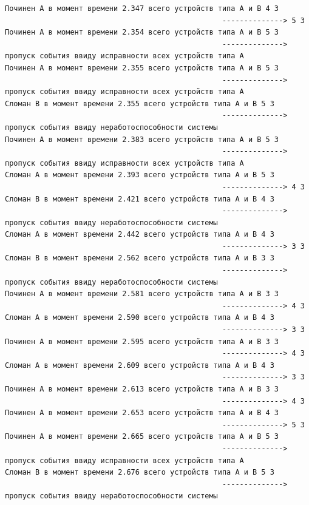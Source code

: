 \begin{verbatim}
Починен A в момент времени 2.347 всего устройств типа А и В 4 3
                                                  --------------> 5 3
Починен A в момент времени 2.354 всего устройств типа А и В 5 3
                                                  --------------> пропуск события ввиду исправности всех устройств типа А
Починен A в момент времени 2.355 всего устройств типа А и В 5 3
                                                  --------------> пропуск события ввиду исправности всех устройств типа А
Сломан B в момент времени 2.355 всего устройств типа А и В 5 3
                                                  --------------> пропуск события ввиду неработоспособности системы
Починен A в момент времени 2.383 всего устройств типа А и В 5 3
                                                  --------------> пропуск события ввиду исправности всех устройств типа А
Сломан A в момент времени 2.393 всего устройств типа А и В 5 3
                                                  --------------> 4 3
Сломан B в момент времени 2.421 всего устройств типа А и В 4 3
                                                  --------------> пропуск события ввиду неработоспособности системы
Сломан A в момент времени 2.442 всего устройств типа А и В 4 3
                                                  --------------> 3 3
Сломан B в момент времени 2.562 всего устройств типа А и В 3 3
                                                  --------------> пропуск события ввиду неработоспособности системы
Починен A в момент времени 2.581 всего устройств типа А и В 3 3
                                                  --------------> 4 3
Сломан A в момент времени 2.590 всего устройств типа А и В 4 3
                                                  --------------> 3 3
Починен A в момент времени 2.595 всего устройств типа А и В 3 3
                                                  --------------> 4 3
Сломан A в момент времени 2.609 всего устройств типа А и В 4 3
                                                  --------------> 3 3
Починен A в момент времени 2.613 всего устройств типа А и В 3 3
                                                  --------------> 4 3
Починен A в момент времени 2.653 всего устройств типа А и В 4 3
                                                  --------------> 5 3
Починен A в момент времени 2.665 всего устройств типа А и В 5 3
                                                  --------------> пропуск события ввиду исправности всех устройств типа А
Сломан B в момент времени 2.676 всего устройств типа А и В 5 3
                                                  --------------> пропуск события ввиду неработоспособности системы

\end{verbatim}
